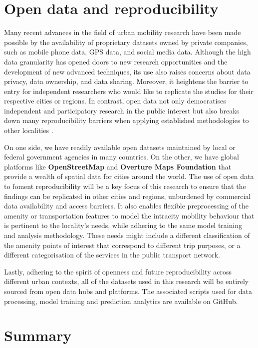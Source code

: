 \section{Open data and reproducibility}

Many recent advances in the field of urban mobility research have been made possible by the availability of proprietary datasets owned by private companies, such as mobile phone data, GPS data, and social media data. Although the high data granularity has opened doors to new research opportunities and the development of new advanced techniques, its use also raises concerns about data privacy, data ownership, and data sharing. Moreover, it heightens the barrier to entry for independent researchers who would like to replicate the studies for their respective cities or regions. In contrast, open data not only democratises independent and participatory research in the public interest but also breaks down many reproducibility barriers when applying established methodologies to other localities \citep{yadavRoleOpenData2017}.

On one side, we have readily available open datasets maintained by local or federal government agencies in many countries. On the other, we have global platforms like \textbf{OpenStreetMap} and \textbf{Overture Maps Foundation} that provide a wealth of spatial data for cities around the world. The use of open data to foment reproducibility will be a key focus of this research to ensure that the findings can be replicated in other cities and regions, unburdened by commercial data availability and access barriers. It also enables flexible preprocessing of the amenity or transportation features to model the intracity mobility behaviour that is pertinent to the locality's needs, while adhering to the same model training and analysis methodology. These needs might include a different classification of the amenity points of interest that correspond to different trip purposes, or a different categorisation of the services in the public transport network. 

Lastly, adhering to the spirit of openness and future reproducibility across different urban contexts, all of the datasets used in this research will be entirely sourced from open data hubs and platforms. The associated scripts used for data processing, model training and prediction analytics are available on GitHub.

\section{Summary}

